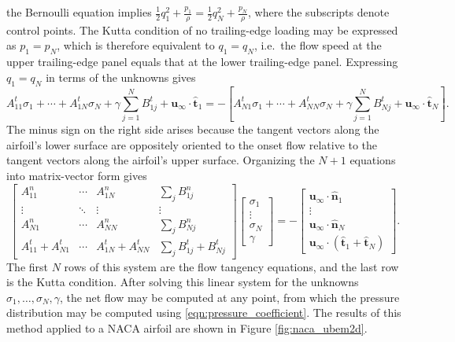\documentclass[10pt]{article}
\newcommand\figref[1]{Figure \ref{#1}}
\def\ie{i.e.~}
\begin{document}
the Bernoulli equation implies $\frac{1}{2}q_1^2+\frac{p_1}{\rho}=\frac{1}{2}q_N^2+\frac{p_N}{\rho}$, where the subscripts denote control points. The Kutta condition of no trailing-edge loading may be expressed as $p_1=p_N$, which is therefore equivalent to $q_1=q_N$, \ie the flow speed at the upper trailing-edge panel equals that at the lower trailing-edge panel.  Expressing $q_1=q_N$ in terms of the unknowns gives \[A_{11}^t\sigma_1+\cdots+A_{1N}^t\sigma_N+\gamma\sum_{j=1}^NB_{1j}^t+\mathbf u_\infty\cdot\hat{\mathbf t}_1=-\left[A_{N1}^t\sigma_1+\cdots+A_{NN}^t\sigma_N+\gamma\sum_{j=1}^NB_{Nj}^t+\mathbf u_\infty\cdot\hat{\mathbf t}_N\right].\]  The minus sign on the right side arises because the tangent vectors along the airfoil's lower surface are oppositely oriented to the onset flow relative to the tangent vectors along the airfoil's upper surface.  Organizing the $N+1$ equations into matrix-vector form gives \[\begin{bmatrix}A_{11}^n &\cdots &A_{1N}^n &\sum_jB_{1j}^n\\\vdots &\ddots &\vdots &\vdots\\A_{N1}^n &\cdots &A_{NN}^n &\sum_jB_{Nj}^n\\A_{11}^t+A_{N1}^t &\cdots &A_{1N}^t+A_{NN}^t &\sum_jB_{1j}^t+B_{Nj}^t\end{bmatrix}\begin{bmatrix}\sigma_1\\\vdots\\\sigma_N\\\gamma\end{bmatrix} = -\begin{bmatrix}\mathbf u_\infty\cdot\hat{\mathbf n}_1\\\vdots\\\mathbf u_\infty\cdot\hat{\mathbf n}_N\\\mathbf u_\infty\cdot(\hat{\mathbf t}_1+\hat{\mathbf t}_N)\end{bmatrix}.\]  The first $N$ rows of this system are the flow tangency equations, and the last row is the Kutta condition.  After solving this linear system for the unknowns $\sigma_1,\ldots,\sigma_N,\gamma$, the net flow may be computed at any point, from which the pressure distribution may be computed using \eqref{eqn:pressure_coefficient}.  The results of this method applied to a NACA airfoil are shown in \figref{fig:naca_ubem2d}.
\end{document}
